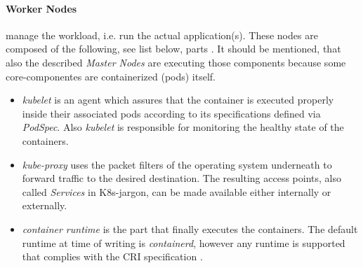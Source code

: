 \documentclass[MSC,Master,english]{twbook}%
\begin{document}
\paragraph{Worker Nodes} manage the workload, i.e. run the actual application(s). These nodes are composed of the following, see list below, parts \cite{k8scomp}. It should be mentioned, that also the described \textit{Master Nodes} are executing those components because some core-componentes are containerized (pods) itself. 
\begin{itemize}
    \item \textit{kubelet} is an agent which assures that the container is executed properly inside their associated pods according to its specifications defined via \textit{PodSpec}. Also \textit{kubelet} is responsible for monitoring the healthy state of the containers.
    \item \textit{kube-proxy} uses the packet filters of the operating system underneath to forward traffic to the desired destination. The resulting access points, also called \textit{Services} in \ac{K8s}-jargon, can be made available either internally or externally.
    \item \textit{container runtime} is the part that finally executes the containers. The default runtime at time of writing is \textit{containerd}, however any runtime is supported that complies with the CRI specification \cite{cri-runtime}.
\end{itemize}
\end{document}
